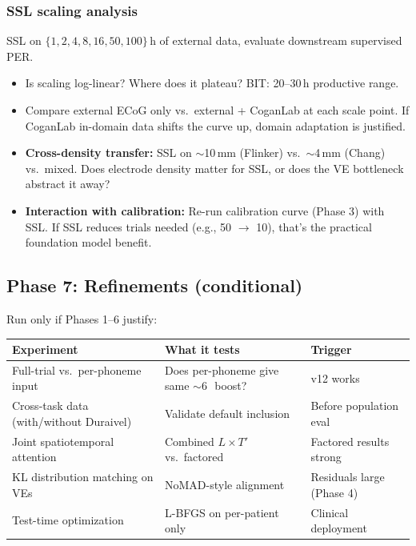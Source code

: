\documentclass[11pt,letterpaper]{article}
\newcommand{\pp}{\,\text{pp}}
\begin{document}
\subsubsection{SSL scaling analysis}

SSL on $\{1, 2, 4, 8, 16, 50, 100\}$\,h of external data, evaluate downstream supervised PER.

\begin{itemize}[leftmargin=2em]
\item Is scaling log-linear? Where does it plateau? BIT: 20--30\,h productive range.
\item Compare external ECoG only vs.\ external + CoganLab at each scale point. If CoganLab in-domain data shifts the curve up, domain adaptation is justified.
\item \textbf{Cross-density transfer:} SSL on ${\sim}$10\,mm (Flinker) vs.\ ${\sim}$4\,mm (Chang) vs.\ mixed. Does electrode density matter for SSL, or does the VE bottleneck abstract it away?
\item \textbf{Interaction with calibration:} Re-run calibration curve (Phase 3) with SSL. If SSL reduces trials needed (e.g., 50 $\to$ 10), that's the practical foundation model benefit.
\end{itemize}

\subsection{Phase 7: Refinements (conditional)}\label{sec:phase7}

Run only if Phases 1--6 justify:

\begin{table}[ht!]\centering\small
\begin{tabular}{@{}lp{5cm}p{4cm}@{}}
\toprule
\textbf{Experiment} & \textbf{What it tests} & \textbf{Trigger} \\
\midrule
Full-trial vs.\ per-phoneme input & Does per-phoneme give same ${\sim}$6\pp\ boost? & v12 works \\
Cross-task data (with/without Duraivel) & Validate default inclusion & Before population eval \\
Joint spatiotemporal attention & Combined $L \times T'$ vs.\ factored & Factored results strong \\
KL distribution matching on VEs & NoMAD-style alignment~\cite{karpowicz2025nomad} & Residuals large (Phase 4) \\
Test-time optimization & L-BFGS on per-patient only & Clinical deployment \\
\bottomrule
\end{tabular}
\end{table}
\end{document}
